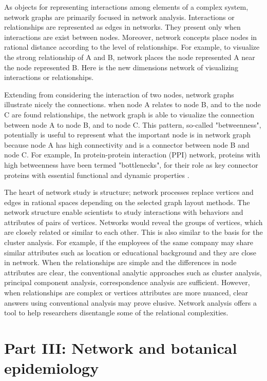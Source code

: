 As objects for representing interactions among elements of a complex system, network graphs are primarily focused in network analysis. Interactions or relationships are represented as edges in networks. They present only when interactions are exist between nodes. Moreover, network concepts place nodes in rational distance according to the level of relationships. For example, to visualize the strong relationship of A and B, network places the node represented A near the node represented B. Here is the new dimensions network of visualizing interactions or relationships.
 
Extending from considering the interaction of two nodes, network graphs illustrate nicely the connections. when node A relates to node B, and to the node C are found relationships, the network graph is able to visualize the connection between node A to node B, and to node C. This pattern, so-called "betweenness", potentially is useful to represent what the important node is in network graph because node A has high connectivity and is a connector between node B and node C. For example, In protein-protein interaction (PPI) network, proteins with high betweenness have been termed "bottlenecks", for their role as key connector proteins with essential functional and dynamic properties .

The heart of network study is structure; network processes replace vertices and edges in rational spaces depending on the selected graph layout methods. The network structure enable scientists to study interactions with behaviors and attributes of pairs of vertices. Networks would reveal the groups of vertices, which are closely related or similar to each other. This is also similar to the basis for the cluster analysis. For example, if the employees of the same company may share similar attributes such as location or educational background and they are close in network. When the relationships are simple and the differences in node attributes are clear, the conventional analytic approaches such as cluster analysis, principal component analysis, correspondence analysis are sufficient. However, when relationships are complex or vertices attributes are more nuanced, clear answers using conventional analysis may prove elusive. Network analysis offers a tool to help researchers disentangle some of the relational complexities.

\section*{Part III: Network and botanical epidemiology}
\label{ch:partthree}

